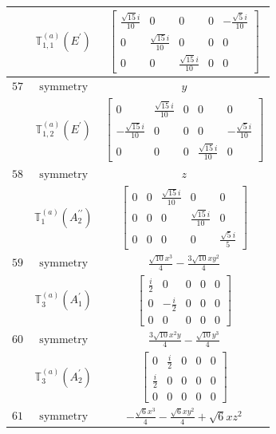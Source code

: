 \documentclass[fleqn,8pt,landscape]{jsarticle}
\begin{document}
\begin{longtable}{ccc}
$  $ & $ \mathbb{T}_{1,1}^{(a)}(E^{\prime}) $ & $ \begin{bmatrix} \frac{\sqrt{15} i}{10} & 0 & 0 & 0 & - \frac{\sqrt{5} i}{10} \\ 0 & \frac{\sqrt{15} i}{10} & 0 & 0 & 0 \\ 0 & 0 & \frac{\sqrt{15} i}{10} & 0 & 0 \end{bmatrix} $ \\ \hline
$ 57 $ & $ \text{symmetry} $ & $ y $ \\
$  $ & $ \mathbb{T}_{1,2}^{(a)}(E^{\prime}) $ & $ \begin{bmatrix} 0 & \frac{\sqrt{15} i}{10} & 0 & 0 & 0 \\ - \frac{\sqrt{15} i}{10} & 0 & 0 & 0 & - \frac{\sqrt{5} i}{10} \\ 0 & 0 & 0 & \frac{\sqrt{15} i}{10} & 0 \end{bmatrix} $ \\ \hline
$ 58 $ & $ \text{symmetry} $ & $ z $ \\
$  $ & $ \mathbb{T}_{1}^{(a)}(A_{2}^{\prime\prime}) $ & $ \begin{bmatrix} 0 & 0 & \frac{\sqrt{15} i}{10} & 0 & 0 \\ 0 & 0 & 0 & \frac{\sqrt{15} i}{10} & 0 \\ 0 & 0 & 0 & 0 & \frac{\sqrt{5} i}{5} \end{bmatrix} $ \\ \hline
$ 59 $ & $ \text{symmetry} $ & $ \frac{\sqrt{10} x^{3}}{4} - \frac{3 \sqrt{10} x y^{2}}{4} $ \\
$  $ & $ \mathbb{T}_{3}^{(a)}(A_{1}^{\prime}) $ & $ \begin{bmatrix} \frac{i}{2} & 0 & 0 & 0 & 0 \\ 0 & - \frac{i}{2} & 0 & 0 & 0 \\ 0 & 0 & 0 & 0 & 0 \end{bmatrix} $ \\ \hline
$ 60 $ & $ \text{symmetry} $ & $ \frac{3 \sqrt{10} x^{2} y}{4} - \frac{\sqrt{10} y^{3}}{4} $ \\
$  $ & $ \mathbb{T}_{3}^{(a)}(A_{2}^{\prime}) $ & $ \begin{bmatrix} 0 & \frac{i}{2} & 0 & 0 & 0 \\ \frac{i}{2} & 0 & 0 & 0 & 0 \\ 0 & 0 & 0 & 0 & 0 \end{bmatrix} $ \\ \hline
$ 61 $ & $ \text{symmetry} $ & $ - \frac{\sqrt{6} x^{3}}{4} - \frac{\sqrt{6} x y^{2}}{4} + \sqrt{6} x z^{2} $ \\

\end{longtable}
\end{document}

